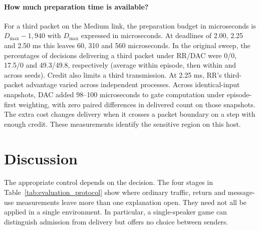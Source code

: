 \documentclass[a4paper,fleqn]{cas-dc}
\begin{document}
\paragraph{How much preparation time is available?}
For a third packet on the Medium link, the preparation budget in microseconds is $D_{\max}-1{,}940$ with $D_{\max}$ expressed in microseconds. At deadlines of 2.00, 2.25 and 2.50 ms this leaves 60, 310 and 560 microseconds. In the original sweep, the percentages of decisions delivering a third packet under RR/DAC were 0/0, 17.5/0 and 49.3/49.8, respectively (average within episode, then within and across seeds). Credit also limits a third transmission. At 2.25 ms, RR's third-packet advantage varied across independent processes. Across identical-input snapshots, DAC added 98--100 microseconds to gate computation under episode-first weighting, with zero paired differences in delivered count on those snapshots. The extra cost changes delivery when it crosses a packet boundary on a step with enough credit. These measurements identify the sensitive region on this host.
\section{Discussion}
\label{sec:discussion}
The appropriate control depends on the decision. The four stages in Table~\ref{tab:evaluation_protocol} show where ordinary traffic, return and message-use measurements leave more than one explanation open. They need not all be applied in a single environment. In particular, a single-speaker game can distinguish admission from delivery but offers no choice between senders.
\end{document}
